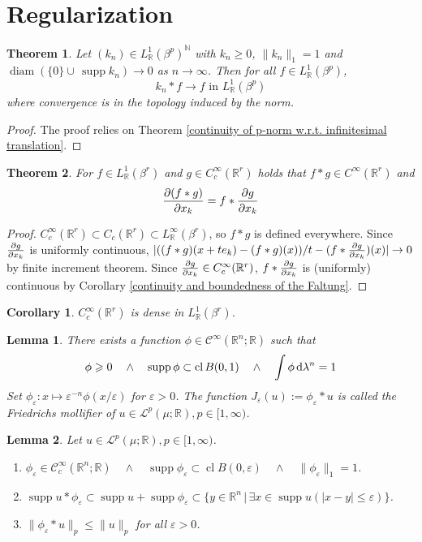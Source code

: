 \documentclass[11pt, a4paper, openany]{book}
\newtheorem{thm}{Theorem}\newtheorem{lem}{Lemma}\newtheorem{crl}{Corollary}
\theoremstyle{definition}
\DeclareMathOperator{\diam}{diam}
\DeclareMathOperator{\supp}{supp}
\DeclareMathOperator{\cl}{cl}
\begin{document}
\section{Regularization}
    \begin{thm}\label{unit generalized L^1 functions}
        Let $(k_n)\in L^1_\mathbb{R}(\beta^p)^\mathbb{N}$ with $k_n\geqslant 0$, $\|k_n\|_1=1$ and $\diam(\{0\}\cup \,\supp k_n)\to 0$ as $n\to \infty$. Then for all $f\in L^1_\mathbb{R}(\beta^p)$,
        \[
            k_n*f{\rightarrow} f\text{ in }L^1_\mathbb{R}(\beta^p)
        \]
        where convergence is in the topology induced by the norm.
    \end{thm}
    \begin{proof}
        The proof relies on Theorem \ref{continuity of p-norm w.r.t. infinitesimal translation}.
    \end{proof}
    \begin{thm}
        For $f\in L^1_\mathbb{R}(\beta^r)$ and $g\in C_c^\infty(\mathbb{R}^r)$ holds that $f*g\in C^\infty(\mathbb{R}^r)$ and
        \[
            \pdv{(f*g)}{x_k}=f*\pdv{g}{x_k}
        \]
    \end{thm}
    \begin{proof}
        $C_c^\infty(\mathbb{R}^r)\subset C_c(\mathbb{R}^r)\subset L^\infty_\mathbb{R}(\beta^r)$, so $f*g$ is defined everywhere. Since $\pdv{g}{x_k}$ is uniformly continuous, $|((f*g)(x+te_k)-(f*g)(x))/t-(f*\pdv{g}{x_k})(x)|\to 0$ by finite increment theorem. Since $\pdv{g}{x_k}\in C_c^\infty(\mathbb{R}^r)$, $f*\pdv{g}{x_k}$ is (uniformly) continuous by Corollary \ref{continuity and boundedness of the Faltung}.
    \end{proof}
    \begin{crl}
        $C_c^\infty(\mathbb{R}^r)$ is dense in $L^1_\mathbb{R}(\beta^r)$.
    \end{crl}
    \begin{lem}
        There exists a function $\phi\in \mathcal{C}^\infty(\mathbb{R}^n;\mathbb{R})$ such that
        \[\phi\geqslant 0\quad\wedge\quad \supp\phi\subset\cl B(0,1)\quad\wedge\quad\int\phi\odif \lambda^n=1\]
        Set $\phi_\varepsilon:x\mapsto \varepsilon^{-n}\phi(x/\varepsilon)$ for $\varepsilon>0$. The function $J_\varepsilon(u):=\phi_{\varepsilon}*u$ is called the Friedrichs mollifier of $u\in\mathcal{L}^p(\mu;\mathbb{R}),p\in[1,\infty)$.
    \end{lem}
    \begin{lem}
        Let $u\in\mathcal{L}^p(\mu;\mathbb{R}),p\in[1,\infty)$.
        \begin{enumerate}
            \item $\phi_\varepsilon\in\mathcal{C}_c^\infty(\mathbb{R}^n;\mathbb{R})\quad\wedge\quad\supp\phi_\varepsilon\subset\cl B(0,\varepsilon)\quad\wedge\quad\|\phi_\varepsilon\|_1=1$.
            \item $\supp u*\phi_\varepsilon\subset \supp u+\supp \phi_\varepsilon\subset \{y\in\mathbb{R}^n\,|\,\exists x\in\supp u(|x-y|\leqslant\varepsilon)\}$.
            \item $\|\phi_\varepsilon*u\|_p\leqslant \|u\|_p$ for all $\varepsilon>0$.
        \end{enumerate}
    \end{lem}
\end{document}
